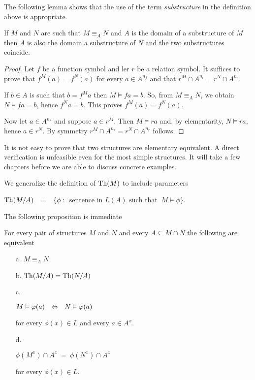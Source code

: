 The following lemma shows that the use of the term \textit{substructure\/} in the definition above is appropriate.

\begin{lemma}\label{eqelsubstructure}
If $M$ and $N$ are such that $M\equiv_AN$ and $A$ is the domain of a substructure of $M$ then $A$ is also the domain a substructure of $N$ and the two substructures coincide.
\end{lemma}
\begin{proof}
Let $f$ be a function symbol and ler $r$ be a relation symbol.
It suffices to prove that  
$f^M(a)=f^N(a)$ for every $a\in A^{n_f}$ and that $r^M\cap A^{n_r}=r^N\cap A^{n_r}$.

If $b\in A$ is such that $b=f^Ma$ then $M\models fa=b$.
So, from $M\equiv_AN$, we obtain $N\models fa=b$, hence $f^Na=b$.
This proves $f^M(a)=f^N(a)$.

Now let $a\in A^{n_r}$ and suppose $a\in r^M$.
Then $M\models ra$ and, by elementarity, $N\models ra$, hence $a\in r^N$.
By symmetry $r^M\cap A^{n_r}=r^N\cap A^{n_r}$ follows.
\end{proof}

It is not easy to prove that two structures are elementary equivalent.
A direct verification is unfeasible even for the most simple structures.
It will take a few chapters before we are able to discuss concrete examples.

We generalize the definition of ${\rm Th}(M)$ to include parameters 

\hfil\emph{${\rm Th}(M/A)$}\ \ =\ \ $\Big\{\phi\ :\ \textrm{ sentence in }L(A)\textrm{  such that }\  M\models\phi\Big\}$.

The following proposition is immediate

\begin{proposition}\label{equivalentielementareequivaleza}
For every pair of structures $M$ and $N$ and every $A\subseteq M\cap N$ the following are equivalent
\begin{itemize}
\item[a.] $M\equiv_A N$
\item[b.] ${\rm Th}(M/A)={\rm Th}(N/A)$
\item[c.] \parbox{27ex}{$M\vDash\varphi(a)\ \ \Leftrightarrow\ \ N\vDash \varphi(a)$}  for every $\phi(x)\in L$ and every $a\in A^x$.
\item[d.]  \parbox{27ex}{$\phi(M^x) \cap A^x\ =\ \phi(N^x) \cap A^x$} for every $\phi(x)\in L$.
\end{itemize}
\end{proposition}

